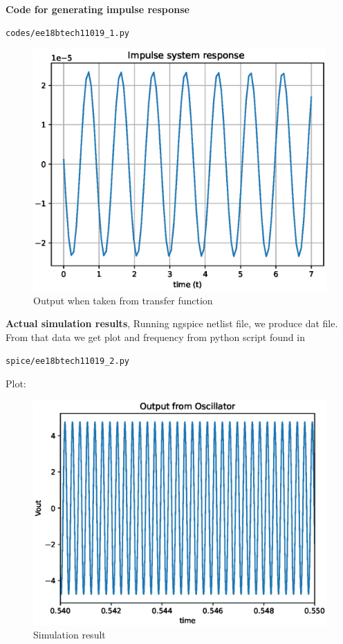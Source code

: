 \begin{enumerate}[label=\arabic*.,ref=\theenumi]
\textbf{Code for generating impulse response}
\begin{lstlisting}
codes/ee18btech11019_1.py
\end{lstlisting}
\begin{figure}[!ht]
\centering
\includegraphics[width=\columnwidth]{./figs/ee18btech11019_5.eps}
\caption{Output when taken from transfer function}
\label{fig:ee18btech11019_plot_1}
\end{figure}



\textbf{Actual simulation results}, \newline
Running ngspice netlist file, we produce dat file. From that data we get plot and frequency from  python script found in\newline
\begin{lstlisting}
spice/ee18btech11019_2.py
\end{lstlisting}
Plot:\newline
\begin{figure}[!ht]
\centering
\includegraphics[width=\columnwidth]{./figs/ee18btech11019_6.eps}
\caption{Simulation result}
\label{fig:ee18btech11019_plot_2}
\end{figure}


\end{enumerate}
